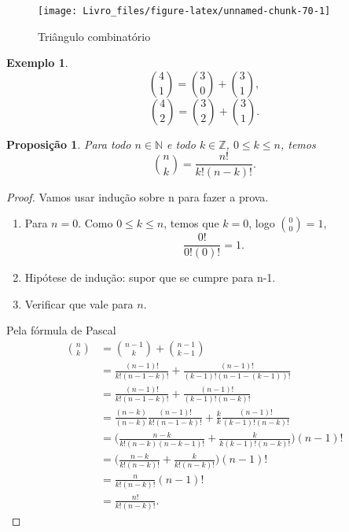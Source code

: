 \documentclass[]{book}
\newtheorem{proposition}{Proposição}[chapter]
\theoremstyle{definition}
\theoremstyle{definition}
\newtheorem{example}{Exemplo}[chapter]
\theoremstyle{definition}
\theoremstyle{remark}
\begin{document}
\begin{figure}

{\centering \texttt{[image: Livro\_files/figure-latex/unnamed-chunk-70-1]} 

}

\caption{Triângulo combinatório}\label{fig:unnamed-chunk-70}
\end{figure}

\begin{example}
\protect\hypertarget{exm:unnamed-chunk-71}{}{\label{exm:unnamed-chunk-71} }\[{4 \choose 1} = {3 \choose 0} + {3 \choose 1},\]
\[{4 \choose 2} = {3 \choose 2} + {3 \choose 1}.\]
\end{example}

\begin{proposition}
\protect\hypertarget{prp:unnamed-chunk-72}{}{\label{prp:unnamed-chunk-72} }Para todo \(n \in \mathbb{N}\) e todo \(k \in \mathbb{Z}\), \(0 \leq k \leq n\), temos
\[{n \choose k} = \frac{n!}{k!(n-k)!}.\]
\end{proposition}

\begin{proof}
\iffalse{} {Prova. } \fi{}Vamos usar indução sobre n para fazer a prova.

\begin{enumerate}
\def\labelenumi{\arabic{enumi}.}
\item
  Para \(n=0\). Como \(0 \leq k \leq n\), temos que \(k=0\), logo \({0 \choose 0} =1\),
  \[\frac{0!}{0!(0)!}=1.\]
\item
  Hipótese de indução: supor que se cumpre para n-1.
\item
  Verificar que vale para \(n\).
\end{enumerate}

Pela fórmula de Pascal
\begin{align}
{n \choose k} &= {n-1 \choose k} + {n-1 \choose k-1} \\
&= \frac{(n-1)!}{k!(n-1-k)!} + \frac{(n-1)!}{(k-1)!(n-1-(k-1))!} \\
&= \frac{(n-1)!}{k!(n-1-k)!} + \frac{(n-1)!}{(k-1)!(n-k)!} \\
&= \frac{(n-k)}{(n-k)}\frac{(n-1)!}{k!(n-1-k)!} + \frac{k}{k}\frac{(n-1)!}{(k-1)!(n-k)!} \\
&= \bigg(\frac{n-k}{k!(n-k)(n-k-1)!} + \frac{k}{k(k-1)!(n-k)!} \bigg)(n-1)! \\
&= \bigg(\frac{n-k}{k!(n-k)!} + \frac{k}{k!(n-k)!} \bigg)(n-1)! \\
&= \frac{n}{k!(n-k)!}(n-1)! \\
&= \frac{n!}{k!(n-k)!}.
\end{align}
\end{proof}
\end{document}
